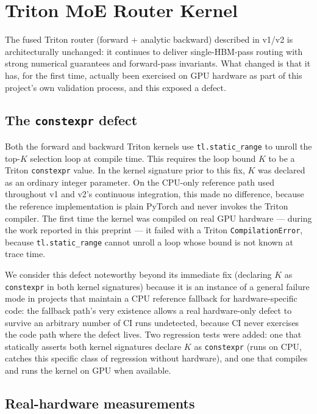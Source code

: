 \documentclass[11pt]{article}
\begin{document}
\section{Triton MoE Router Kernel}
\label{sec:triton}

The fused Triton router (forward + analytic backward) described in v1/v2
is architecturally unchanged: it continues to deliver single-HBM-pass
routing with strong numerical guarantees and forward-pass invariants. What
changed is that it has, for the first time, actually been exercised on GPU
hardware as part of this project's own validation process, and this
exposed a defect.

\subsection{The \texttt{constexpr} defect}

Both the forward and backward Triton kernels use \texttt{tl.static\_range}
to unroll the top-$K$ selection loop at compile time. This requires the
loop bound $K$ to be a Triton \texttt{constexpr} value. In the kernel
signature prior to this fix, $K$ was declared as an ordinary integer
parameter. On the CPU-only reference path used throughout v1 and v2's
continuous integration, this made no difference, because the reference
implementation is plain PyTorch and never invokes the Triton compiler. The
first time the kernel was compiled on real GPU hardware --- during the
work reported in this preprint --- it failed with a Triton
\texttt{CompilationError}, because \texttt{tl.static\_range} cannot unroll
a loop whose bound is not known at trace time.

We consider this defect noteworthy beyond its immediate fix (declaring $K$
as \texttt{constexpr} in both kernel signatures) because it is an instance
of a general failure mode in projects that maintain a CPU reference
fallback for hardware-specific code: the fallback path's very existence
allows a real hardware-only defect to survive an arbitrary number of CI
runs undetected, because CI never exercises the code path where the defect
lives. Two regression tests were added: one that statically asserts both
kernel signatures declare $K$ as \texttt{constexpr} (runs on CPU, catches
this specific class of regression without hardware), and one that
compiles and runs the kernel on GPU when available.

\subsection{Real-hardware measurements}
\end{document}

